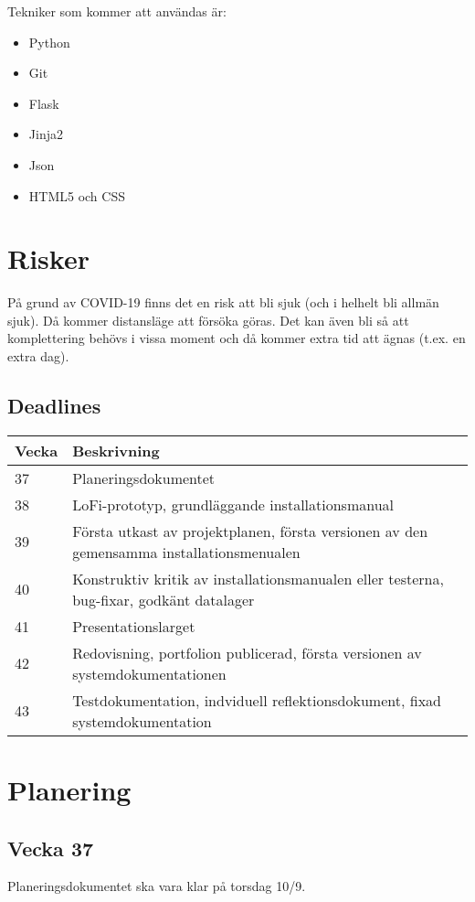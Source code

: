 \documentclass{TDP003mall}
\begin{document}
Tekniker som kommer att användas är:

\begin{itemize}
\item
  Python
\item
  Git
\item
  Flask
\item
  Jinja2
\item
  Json
\item
  HTML5 och CSS
\end{itemize}

\section{Risker}
På grund av COVID-19 finns det en risk att bli sjuk (och i helhelt bli allmän sjuk). Då kommer distansläge att försöka göras. Det kan även bli så att komplettering behövs i vissa moment och då kommer extra tid att ägnas (t.ex. en extra dag).

\subsection{Deadlines}
\begin{table}[!h]
\begin{tabularx}{\linewidth}{|l|X|}
\hline
Vecka & Beskrivning \\\hline
37 & Planeringsdokumentet \\\hline
38 & LoFi-prototyp, grundläggande installationsmanual \\\hline
39 & Första utkast av projektplanen, första versionen av den gemensamma installationsmenualen \\\hline
40 & Konstruktiv kritik av installationsmanualen eller testerna, bug-fixar, godkänt datalager \\\hline
41 & Presentationslarget \\\hline
42 & Redovisning, portfolion publicerad, första versionen av systemdokumentationen \\\hline
43 & Testdokumentation, indviduell reflektionsdokument, fixad systemdokumentation \\\hline
\end{tabularx}
\end{table}

\newpage

\section{Planering}
\subsection*{Vecka 37}
Planeringsdokumentet ska vara klar på torsdag 10/9.
\end{document}
